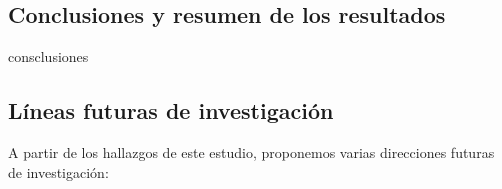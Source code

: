 \documentclass[../main.tex]{subfiles}
\begin{document}
\label{sec:conclusiones}

\subsection{Conclusiones y resumen de los resultados}
\label{sec:conc-resumen}
consclusiones

\subsection{Líneas futuras de investigación}
\label{sec:lineasfuturas}

A partir de los hallazgos de este estudio, proponemos varias direcciones futuras de investigación:
\end{document}
